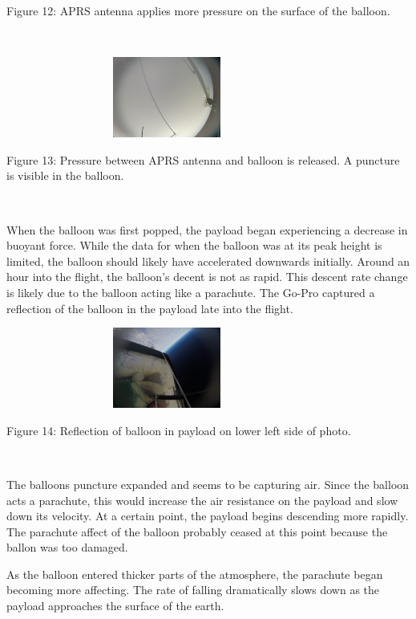 \documentclass[12pt,]{article}
\begin{document}
Figure 12: APRS antenna applies more pressure on the surface of the
balloon.

~

\begin{center}\includegraphics[width=400px,height=100px]{assets/IMAGEBREAKC} \end{center}

Figure 13: Pressure between APRS antenna and balloon is released. A
puncture is visible in the balloon.

~

When the balloon was first popped, the payload began experiencing a
decrease in buoyant force. While the data for when the balloon was at
its peak height is limited, the balloon should likely have accelerated
downwards initially. Around an hour into the flight, the balloon's
decent is not as rapid. This descent rate change is likely due to the
balloon acting like a parachute. The Go-Pro captured a reflection of the
balloon in the payload late into the flight.

\begin{center}\includegraphics[width=400px,height=100px]{assets/IMAGEBREAKD} \end{center}

Figure 14: Reflection of balloon in payload on lower left side of photo.

~

The balloons puncture expanded and seems to be capturing air. Since the
balloon acts a parachute, this would increase the air resistance on the
payload and slow down its velocity. At a certain point, the payload
begins descending more rapidly. The parachute affect of the balloon
probably ceased at this point because the ballon was too damaged.

As the balloon entered thicker parts of the atmosphere, the parachute
began becoming more affecting. The rate of falling dramatically slows
down as the payload approaches the surface of the earth.
\end{document}
